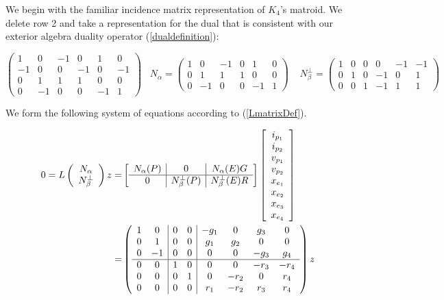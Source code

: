 We begin with the familiar incidence matrix representation of $K_4$'s matroid.
We delete row 2 and take a representation for the dual that is consistent
with our exterior algebra duality operator (\ref{dualdefinition}):


\[
\left(\begin{array}{cc|cccc}
1 & 0 & -1 & 0 & 1 & 0 \\
-1 & 0 & 0 & -1 & 0 & -1 \\
0 & 1 & 1 & 1 & 0 & 0 \\
0 & -1 & 0 & 0 & -1 & 1
\end{array}\right)
\;\;\;
N_\alpha=
\left(\begin{array}
{cc|cccc}
1 & 0 & -1 & 0 & 1 & 0 \\
0 & 1 & 1 & 1 & 0 & 0 \\
0 & -1 & 0 & 0 & -1 & 1
\end{array}\right)
\;\;\;\;
N_\beta^\perp =
\left(\begin{array}{cc|cccc}
1 & 0 & 0 & 0 & -1 & -1 \\
0 & 1 & 0 & -1 & 0 & 1 \\
0 & 0 & 1 & -1 & 1 & 1
\end{array}\right)
\]


We form the following system of equations according to (\ref{LmatrixDef}).

\begin{equation}\label{K4Equation}
\begin{split}
  0=L\left(\begin{array}{cc} {\ensuremath{N_{\alpha}}} \\ {N_{\beta}^{\perp}}  \end{array}\right)z
    =& \left[\begin{array}{c|c|c} N_{\alpha}(P)  &  0  &  N_{\alpha}(E)G \\  \hline
        0  & N_{\beta}^{\perp}(P)  &  N_{\beta}^{\perp}(E)R \end{array}\right]
    \left[ \begin{array}{c} i_{p_1} \\ i_{p_2} \\ v_{p_1} \\ v_{p_2} \\ x_{e_1} \\ x_{e_2} \\ x_{e_3} \\ x_{e_4}
      \end{array}
      \right]
    \\
    =&
\left(\begin{array}{cc|cc|cccc}
1 & 0 & 0 & 0 & -g_{1} & 0 & g_{3} & 0 \\
0 & 1 & 0 & 0 & g_{1} & g_{2} & 0 & 0 \\
0 & -1 & 0 & 0 & 0 & 0 & -g_{3} & g_{4} \\ \hline
0 & 0 & 1 & 0 & 0 & 0 & -r_{3} & -r_{4} \\
0 & 0 & 0 & 1 & 0 & -r_{2} & 0 & r_{4} \\
0 & 0 & 0 & 0 & r_{1} & -r_{2} & r_{3} & r_{4}
\end{array}\right)z
\end{split}
\end{equation}


